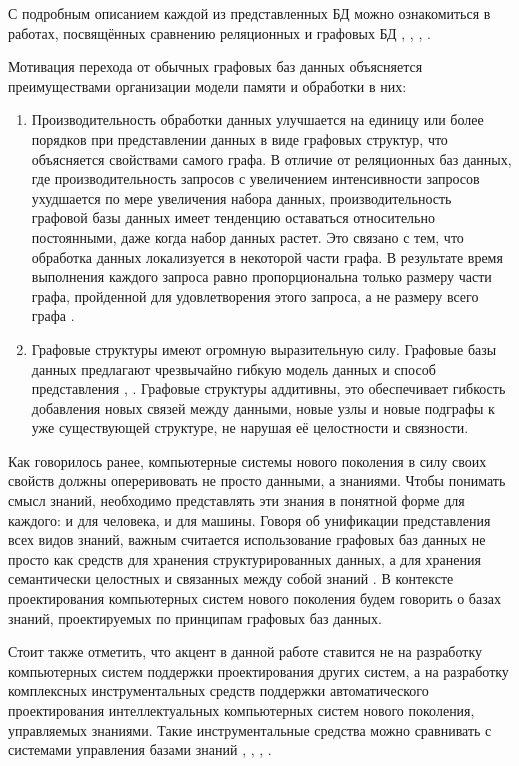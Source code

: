 С подробным описанием каждой из представленных БД можно ознакомиться в работах, посвящённых сравнению  реляционных и графовых БД , \cite{vicknair2010comparison}, , .

Мотивация перехода от обычных графовых баз данных объясняется преимуществами организации модели памяти и обработки в них:
\begin{enumerate}
    \item Производительность обработки данных улучшается на единицу или более порядков при представлении данных в виде графовых структур, что объясняется свойствами самого графа. В отличие от реляционных баз данных, где производительность запросов с увеличением интенсивности запросов ухудшается по мере увеличения набора данных, производительность графовой базы данных имеет тенденцию оставаться относительно постоянными, даже когда набор данных растет. Это связано с тем, что обработка данных локализуется в некоторой части графа. В результате время выполнения каждого запроса равно пропорциональна только размеру части графа, пройденной для удовлетворения этого запроса, а не размеру всего графа \cite{Khasahmadi2020Memory-Based}.
    \item Графовые структуры имеют огромную выразительную силу. Графовые базы данных предлагают чрезвычайно гибкую модель данных и способ представления \cite{Diskrete_Math}, \cite{Reinhard}. Графовые структуры аддитивны, это обеспечивает гибкость добавления новых связей между данными, новые узлы и новые подграфы к уже существующей структуре, не нарушая её целостности и связности.
\end{enumerate}

Как говорилось ранее, компьютерные системы нового поколения в силу своих свойств должны опереривовать не просто данными, а знаниями. Чтобы понимать смысл знаний, необходимо представлять эти знания в понятной форме для каждого: и для человека, и для машины. Говоря об унификации представления всех видов знаний, важным считается использование графовых баз данных не просто как средств для хранения структурированных данных, а для хранения семантически целостных и связанных между собой знаний \cite{SenKB2017}. В контексте проектирования компьютерных систем нового поколения будем говорить о базах знаний, проектируемых по принципам графовых баз данных.

Стоит также отметить, что акцент в данной работе ставится не на разработку компьютерных систем поддержки проектирования других систем, а на разработку комплексных инструментальных средств поддержки автоматического проектирования интеллектуальных компьютерных систем нового поколения, управляемых знаниями. Такие инструментальные средства можно сравнивать с системами управления базами знаний , \cite{Gavrilova2000}, , .

